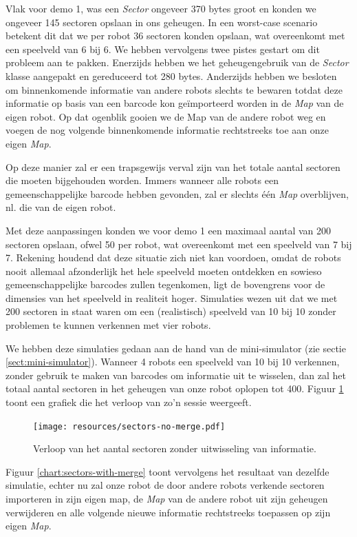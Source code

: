 \documentclass[12pt,a4paper]{report}
\begin{document}
Vlak voor demo 1, was een \emph{Sector} ongeveer 370 bytes groot en konden we ongeveer 145 sectoren opslaan in ons geheugen. In een worst-case scenario betekent dit dat we per robot 36 sectoren konden opslaan, wat overeenkomt met een speelveld van 6 bij 6. We hebben vervolgens twee pistes gestart om dit probleem aan te pakken. Enerzijds hebben we het geheugengebruik van de \emph{Sector} klasse aangepakt en gereduceerd tot 280 bytes. Anderzijds hebben we besloten om binnenkomende informatie van andere robots slechts te bewaren totdat deze informatie op basis van een barcode kon ge\"importeerd worden in de \emph{Map} van de eigen robot. Op dat ogenblik gooien we de Map van de andere robot weg en voegen de nog volgende binnenkomende informatie rechtstreeks toe aan onze eigen \emph{Map}.

Op deze manier zal er een trapsgewijs verval zijn van het totale aantal sectoren die moeten bijgehouden worden. Immers wanneer alle robots een gemeenschappelijke barcode hebben gevonden, zal er slechts \'e\'en \emph{Map} overblijven, nl. die van de eigen robot.

Met deze aanpassingen konden we voor demo 1 een maximaal aantal van 200 sectoren opslaan, ofwel 50 per robot, wat overeenkomt met een speelveld van 7 bij 7. Rekening houdend dat deze situatie zich niet kan voordoen, omdat de robots nooit allemaal afzonderlijk het hele speelveld moeten ontdekken en sowieso gemeenschappelijke barcodes zullen tegenkomen, ligt de bovengrens voor de dimensies van het speelveld in realiteit hoger. Simulaties wezen uit dat we met 200 sectoren in staat waren om een (realistisch) speelveld van 10 bij 10 zonder problemen te kunnen verkennen met vier robots.

We hebben deze simulaties gedaan aan de hand van de mini-simulator (zie sectie \ref{sect:mini-simulator}). Wanneer 4 robots een speelveld van 10 bij 10 verkennen, zonder gebruik te maken van barcodes om informatie uit te wisselen, dan zal het totaal aantal sectoren in het geheugen van onze robot oplopen tot 400. Figuur \ref{chart:sectors-no-merge} toont een grafiek die het verloop van zo'n sessie weergeeft.

\begin{figure}[htbp]
  \centering
  \texttt{[image: resources/sectors-no-merge.pdf]}
  \caption{Verloop van het aantal sectoren zonder uitwisseling van informatie.}
  \label{chart:sectors-no-merge}
\end{figure}

Figuur \ref{chart:sectors-with-merge} toont vervolgens het resultaat van dezelfde simulatie, echter nu zal onze robot de door andere robots verkende sectoren importeren in zijn eigen map, de \emph{Map} van de andere robot uit zijn geheugen verwijderen en alle volgende nieuwe informatie rechtstreeks toepassen op zijn eigen \emph{Map}.
\end{document}
